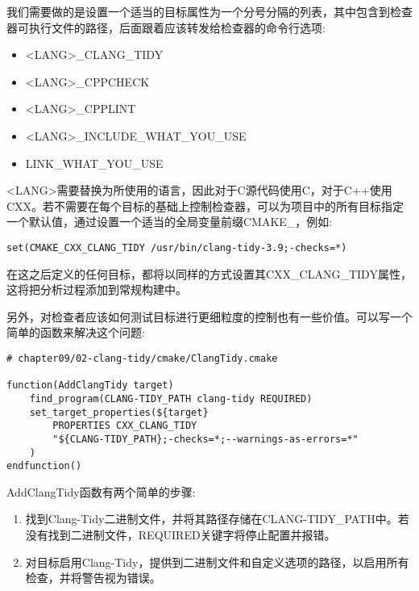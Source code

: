我们需要做的是设置一个适当的目标属性为一个分号分隔的列表，其中包含到检查器可执行文件的路径，后面跟着应该转发给检查器的命令行选项:

\begin{itemize}
\item 
<LANG>\_CLANG\_TIDY

\item 
<LANG>\_CPPCHECK

\item 
<LANG>\_CPPLINT

\item 
<LANG>\_INCLUDE\_WHAT\_YOU\_USE

\item 
LINK\_WHAT\_YOU\_USE
\end{itemize}

<LANG>需要替换为所使用的语言，因此对于C源代码使用C，对于C++使用CXX。若不需要在每个目标的基础上控制检查器，可以为项目中的所有目标指定一个默认值，通过设置一个适当的全局变量前缀CMAKE\_，例如:

\begin{lstlisting}[style=styleCMake]
set(CMAKE_CXX_CLANG_TIDY /usr/bin/clang-tidy-3.9;-checks=*)
\end{lstlisting}

在这之后定义的任何目标，都将以同样的方式设置其CXX\_CLANG\_TIDY属性，这将把分析过程添加到常规构建中。

另外，对检查者应该如何测试目标进行更细粒度的控制也有一些价值。可以写一个简单的函数来解决这个问题:

\begin{lstlisting}[style=styleCMake]
# chapter09/02-clang-tidy/cmake/ClangTidy.cmake

function(AddClangTidy target)
	find_program(CLANG-TIDY_PATH clang-tidy REQUIRED)
	set_target_properties(${target}
		PROPERTIES CXX_CLANG_TIDY
		"${CLANG-TIDY_PATH};-checks=*;--warnings-as-errors=*"
	)
endfunction()
\end{lstlisting}

AddClangTidy函数有两个简单的步骤:

\begin{enumerate}
\item 
找到Clang-Tidy二进制文件，并将其路径存储在CLANG-TIDY\_PATH中。若没有找到二进制文件，REQUIRED关键字将停止配置并报错。

\item 
对目标启用Clang-Tidy，提供到二进制文件和自定义选项的路径，以启用所有检查，并将警告视为错误。
\end{enumerate}

